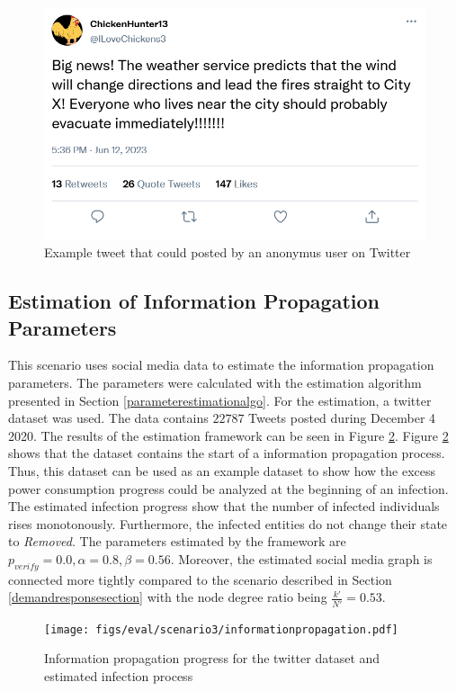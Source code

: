 \begin{figure}[!ht]
    \center
    \includegraphics[scale=.4]{figs/firenews.png}
    \caption{Example tweet that could posted by an anonymus user on Twitter}
    \label{firetweet}
\end{figure}

\subsection{Estimation of Information Propagation Parameters}

This scenario uses social media data to estimate the information 
propagation parameters.
The parameters were calculated with 
the estimation algorithm 
presented in Section \ref{parameterestimationalgo}. 
For the estimation, a 
twitter dataset was used.
The data contains $22787$ Tweets posted during December 4 2020.
The results of the estimation framework can be seen in 
Figure \ref{geoloctweet}. Figure \ref{geoloctweet} shows 
that the dataset contains the start of a 
information propagation process.
Thus, this dataset can be used as an example dataset 
to show how the excess power consumption progress 
could be analyzed at the beginning of an infection.
The estimated infection progress show that the number of infected
individuals rises monotonously. Furthermore, the infected 
entities do not change their state to \textit{Removed}.
The parameters estimated by the framework are 
$p_{verify}= 0.0, \alpha = 0.8, \beta = 0.56$.
Moreover, the estimated social media graph is 
connected more tightly compared to the 
scenario described in Section \ref{demandresponsesection} 
with the node degree ratio being 
$\frac{k'}{N'}=0.53$. 

\begin{figure}[!ht]
    \center
    \texttt{[image: figs/eval/scenario3/informationpropagation.pdf]}
    \caption{Information propagation progress for the twitter dataset 
    and estimated infection process}
    \label{geoloctweet}
\end{figure}

